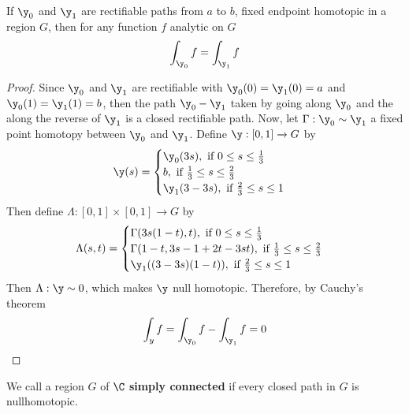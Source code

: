 \begin{theorem}\label{4.6.6}
    If $\y_0$ and $\y_1$ are rectifiable paths from $a$ to $b$, fixed endpoint
    homotopic in a region $G$, then for any function $f$ analytic on $G$
    \begin{equation*}
        \int_{\y_0}{f}=\int_{\y_1}{f}
    \end{equation*}
\end{theorem}
\begin{proof}
    Since $\y_0$ and $\y_1$ are rectifiable with $\y_0(0)=\y_1(0)=a$ and
    $\y_0(1)=\y_1(1)=b$,  then the path $\y_0-\y_1$ taken by going along $\y_0$
    and the along the reverse of $\y_1$ is a closed rectifiable path. Now, let
    $\Gamma:\y_0 \sim \y_1$ a fixed point homotopy between $\y_0$ and $\y_1$.
    Define $\y:[0,1] \xrightarrow{} G$ by
    \begin{equation*}
        \y(s)=\begin{cases}
            \y_0(3s), \text{ if } 0 \leq s \leq \frac{1}{3} \\
            b, \text{ if } \frac{1}{3} \leq s \leq \frac{2}{3}  \\
            \y_1(3-3s), \text{ if } \frac{2}{3} \leq s \leq 1   \\
        \end{cases}
    \end{equation*}
    Then define $\Lambda:[0,1] \times [0,1] \xrightarrow{} G$ by
    \begin{equation*}
        \Lambda(s,t)=\begin{cases}
            \Gamma(3s(1-t),t), \text{ if } 0 \leq s \leq \frac{1}{3} \\
            \Gamma(1-t, 3s-1+2t-3st), \text{ if } \frac{1}{3} \leq s \leq \frac{2}{3}  \\
            \y_1((3-3s)(1-t)), \text{ if } \frac{2}{3} \leq s \leq 1   \\
        \end{cases}
    \end{equation*}
    Then $\Lambda:\y \sim 0$, which makes  $\y$ null homotopic. Therefore, by
    Cauchy's theorem
    \begin{equation*}
        \int_{y}{f}=\int_{\y_0}{f}-\int_{\y_1}{f}=0
    \end{equation*}
\end{proof}

\begin{definition}
    We call a region $G$ of  $\C$  \textbf{simply connected} if every closed
    path in $G$ is nullhomotopic.
\end{definition}

